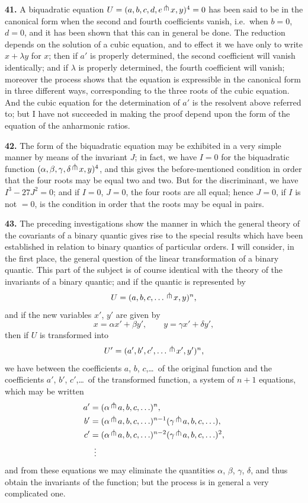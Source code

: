 \documentclass[11pt,a4paper]{article}
\begin{document}
\textbf{41.} A biquadratic equation $U=(a,b,c,d,e\,\raisebox{0.5ex}{$\pitchfork$}\, x,y)^{4}=0$ has been said to be in the canonical form when the second and fourth coefficients vanish, i.e.\ when $b=0$, $d=0$, and it has been shown that this can in general be done. The reduction depends on the solution of a cubic equation, and to effect it we have only to write $x+\lambda y$ for $x$; then if $a'$ is properly determined, the second coefficient will vanish identically; and if $\lambda$ is properly determined, the fourth coefficient will vanish; moreover the process shows that the equation is expressible in the canonical form in three different ways, corresponding to the three roots of the cubic equation. And the cubic equation for the determination of $a'$ is the resolvent above referred to; but I have not succeeded in making the proof depend upon the form of the equation of the anharmonic ratios.

\textbf{42.} The form of the biquadratic equation may be exhibited in a very simple manner by means of the invariant $J$; in fact, we have $I=0$ for the biquadratic function $(\alpha,\beta,\gamma,\delta\,\raisebox{0.5ex}{$\pitchfork$}\, x, y)^{4}$, and this gives the before-mentioned condition in order that the four roots may be equal two and two. But for the discriminant, we have $I^{3}-27J^{2}=0$; and if $I=0$, $J=0$, the four roots are all equal; hence $J=0$, if $I$ is not $=0$, is the condition in order that the roots may be equal in pairs.

\clearpage
\setcounter{page}{266}

\textbf{43.} The preceding investigations show the manner in which the general theory of the covariants of a binary quantic gives rise to the special results which have been established in relation to binary quantics of particular orders. I will consider, in the first place, the general question of the linear transformation of a binary quantic. This part of the subject is of course identical with the theory of the invariants of a binary quantic; and if the quantic is represented by
\[
U=(a,b,c,\ldots\,\raisebox{0.5ex}{$\pitchfork$}\, x,y)^{n},
\]
and if the new variables $x'$, $y'$ are given by
\[
x=\alpha x'+\beta y',\qquad y=\gamma x'+\delta y',
\]
then if $U$ is transformed into
\[
U'=(a',b',c',\ldots\,\raisebox{0.5ex}{$\pitchfork$}\, x',y')^{n},
\]
we have between the coefficients $a$, $b$, $c$,\ldots\ of the original function and the coefficients $a'$, $b'$, $c'$,\ldots\ of the transformed function, a system of $n+1$ equations, which may be written
\begin{align*}
a' &= (\alpha\,\raisebox{0.5ex}{$\pitchfork$}\, a,b,c,\ldots)^{n},\\
b' &= (\alpha\,\raisebox{0.5ex}{$\pitchfork$}\, a,b,c,\ldots)^{n-1}(\gamma\,\raisebox{0.5ex}{$\pitchfork$}\, a,b,c,\ldots),\\
c' &= (\alpha\,\raisebox{0.5ex}{$\pitchfork$}\, a,b,c,\ldots)^{n-2}(\gamma\,\raisebox{0.5ex}{$\pitchfork$}\, a,b,c,\ldots)^{2},\\
&\ \,\vdots
\end{align*}
and from these equations we may eliminate the quantities $\alpha$, $\beta$, $\gamma$, $\delta$, and thus obtain the invariants of the function; but the process is in general a very complicated one.
\end{document}
